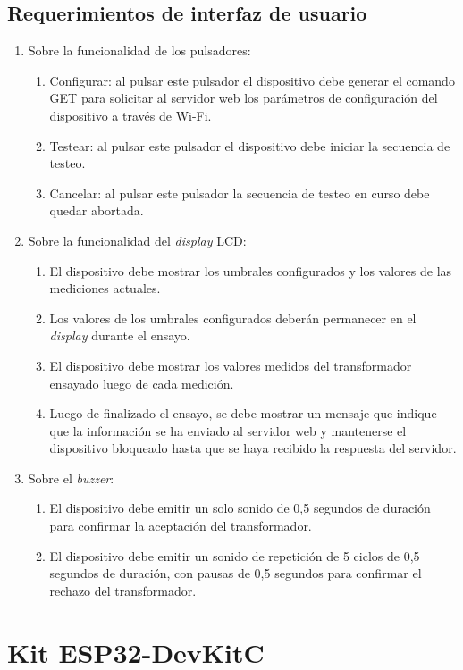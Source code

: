 \subsection{Requerimientos de interfaz de usuario}
\label{subsec:ReqUsu}
	\begin{enumerate}
	\item Sobre la funcionalidad de los pulsadores:
		\begin{enumerate}
		\item Configurar: al pulsar este pulsador el dispositivo debe generar el comando GET para solicitar al servidor web los parámetros de configuración del dispositivo a través de Wi-Fi.
		\item Testear: al pulsar este pulsador el dispositivo debe iniciar la secuencia de testeo.
		\item Cancelar: al pulsar este pulsador la secuencia de testeo en curso debe quedar abortada.
		\end{enumerate}
	\item Sobre la funcionalidad del \textit{display} LCD:
		\begin{enumerate}
		\item El dispositivo debe mostrar los umbrales configurados y los valores de las mediciones actuales.
		\item Los valores de los umbrales configurados deberán permanecer en el \textit{display} durante el ensayo.
		\item El dispositivo debe mostrar los valores medidos del transformador ensayado luego de cada medición.
		\item Luego de finalizado el ensayo, se debe mostrar un mensaje que indique que la información se ha enviado al servidor web y mantenerse el dispositivo bloqueado hasta que se haya recibido la respuesta del servidor.
		\end{enumerate}
	\item Sobre el \textit{buzzer}:
		\begin{enumerate}
		\item El dispositivo debe emitir un solo sonido de 0,5 segundos de duración para confirmar la aceptación del transformador.
		\item El dispositivo debe emitir un sonido de repetición de 5 ciclos de 0,5 segundos de duración, con pausas de 0,5 segundos para confirmar el rechazo del transformador.
		\end{enumerate}		
	\end{enumerate}


\section{Kit ESP32-DevKitC}

